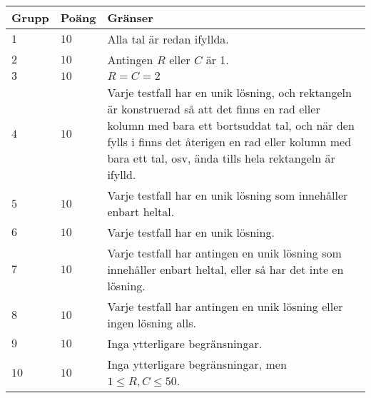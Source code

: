 \noindent
\begin{tabular}{| l | l | p{12cm} |}
  \hline
  \textbf{Grupp} & \textbf{Poäng} & \textbf{Gränser} \\ \hline
  $1$    & $10$         & Alla tal är redan ifyllda.  \\ \hline
  $2$    & $10$         & Antingen $R$ eller $C$ är 1. \\ \hline
  $3$    & $10$         & $R = C = 2$ \\ \hline
  $4$    & $10$         & Varje testfall har en unik lösning, och rektangeln är konstruerad så att det finns en rad eller kolumn med bara ett bortsuddat tal, och när den fylls i finns det återigen en rad eller kolumn med bara ett tal, osv, ända tills hela rektangeln är ifylld.  \\ \hline
  $5$    & $10$         & Varje testfall har en unik lösning som innehåller enbart heltal. \\ \hline
  $6$    & $10$         & Varje testfall har en unik lösning. \\ \hline
  $7$    & $10$         & Varje testfall har antingen en unik lösning som innehåller enbart heltal, eller så har det inte en lösning. \\ \hline
  $8$    & $10$         & Varje testfall har antingen en unik lösning eller ingen lösning alls. \\ \hline
  $9$    & $10$         & Inga ytterligare begränsningar. \\ \hline
  $10$    & $10$         & Inga ytterligare begränsningar, men $1 \le R, C \le 50$. \\ \hline

\end{tabular}

